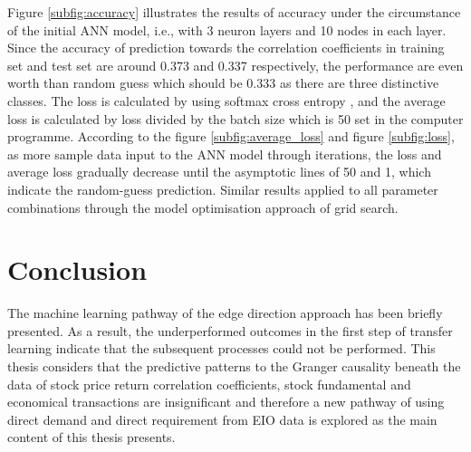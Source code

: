 Figure \ref{subfig:accuracy} illustrates the results of accuracy under the circumstance of the initial ANN model, i.e., with 3 neuron layers and 10 nodes in each layer. Since the accuracy of prediction towards the correlation coefficients in training set and test set are around 0.373 and 0.337 respectively, the performance are even worth than random guess which should be 0.333 as there are three distinctive classes. The loss is calculated by using softmax cross entropy \cite{tensorflow2015-whitepaper}, and the average loss is calculated by loss divided by the batch size which is 50 set in the computer programme. According to the figure \ref{subfig:average_loss} and figure \ref{subfig:loss}, as more sample data input to the ANN model through iterations, the loss and average loss gradually decrease until the asymptotic lines of 50 and 1, which indicate the random-guess prediction. Similar results applied to all parameter combinations through the model optimisation approach of grid search.

\section{Conclusion}
The machine learning pathway of the edge direction approach has been briefly presented. As a result, the underperformed outcomes in the first step of transfer learning indicate that the subsequent processes could not be performed. This thesis considers that the predictive patterns to the Granger causality beneath the data of stock price return correlation coefficients, stock fundamental and economical transactions are insignificant and therefore a new pathway of using direct demand and direct requirement from EIO data is explored as the main content of this thesis presents.
